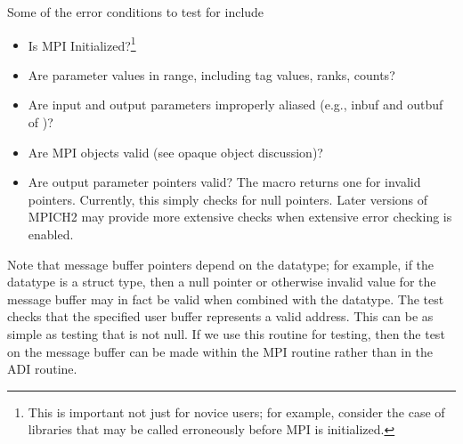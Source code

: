 \documentclass{article}
\def\fixme#1{\marginpar{FIXME:}\textbf{FIXME: #1}}
\begin{document}
Some of the error conditions to test for include
\begin{itemize}
\item Is MPI Initialized?\footnote{This is important not just for
novice users; for example, consider the case of libraries that may be
called erroneously before MPI is initialized.}
\item Are parameter values in range, including tag values, ranks, counts?
\item Are input and output parameters improperly aliased (e.g., inbuf and
  outbuf of   )?
\item Are MPI objects valid (see opaque object discussion)?
\item Are output parameter pointers valid?  The macro
   returns one for
invalid pointers. 
  Currently, this simply checks for null pointers.  Later versions of 
  MPICH2 may provide more extensive checks when extensive error
  checking is enabled.
\end{itemize}
Note that message buffer pointers depend on the datatype; for example,
if the datatype is a
struct type, then a null pointer or otherwise invalid value for the message
buffer may in fact be valid when combined with the datatype.
The test  checks that the
specified user buffer represents a valid address.  This can be as simple as
testing that  is not null.  If we
use 
this routine for testing, then the test on the message buffer can be made
within the MPI routine rather than in the ADI routine.
\end{document}
